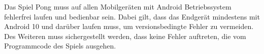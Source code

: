 Das Spiel Pong \gls{muss} auf allen Mobilgeräten mit Android Betriebssystem fehlerfrei laufen und bedienbar sein. Dabei gilt, dass das Endgerät mindestens mit Android 10 und darüber laufen \gls{muss}, um versionsbedingte Fehler zu vermeiden. Des Weiteren \gls{muss} sichergestellt werden, dass keine Fehler auftreten, die vom Programmcode des Spiels ausgehen.  